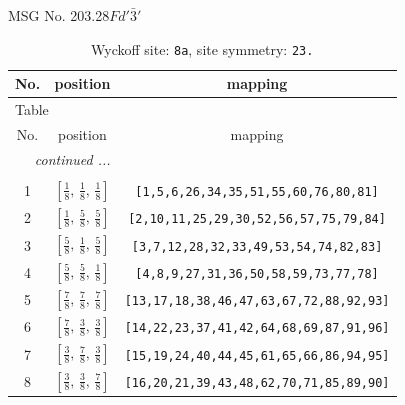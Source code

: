 \documentclass[fleqn,8pt]{jsarticle}
\begin{document}
\setcounter{MaxMatrixCols}{32}

\renewcommand{\tablename}{Table~}
\renewcommand{\figurename}{Figure~}
\begin{center}
\LARGE
MSG No. 203.28\quad$Fd'\bar{3}'$
\end{center}
\renewcommand{\arraystretch}{1.2}
\begin{longtable}{ccc}
\caption{Wyckoff site: {\tt 8a}, site symmetry: {\tt 23.}}
 \\
 \hline \hline
No. & position & mapping \\ \hline \endfirsthead

\multicolumn{2}{l}{\tablename\ \thetable{}} \\
 \hline \hline
No. & position & mapping \\ \hline \endhead

 \hline \hline
\multicolumn{2}{r}{\footnotesize\it continued ...} \\ \endfoot

 \hline \hline
\multicolumn{2}{r}{} \\ \endlastfoot

1 & $\left[ \frac{1}{8},\, \frac{1}{8},\, \frac{1}{8} \right]$ & {\tt [1,5,6,26,34,35,51,55,60,76,80,81]} \\ \hline
2 & $\left[ \frac{1}{8},\, \frac{5}{8},\, \frac{5}{8} \right]$ & {\tt [2,10,11,25,29,30,52,56,57,75,79,84]} \\ \hline
3 & $\left[ \frac{5}{8},\, \frac{1}{8},\, \frac{5}{8} \right]$ & {\tt [3,7,12,28,32,33,49,53,54,74,82,83]} \\ \hline
4 & $\left[ \frac{5}{8},\, \frac{5}{8},\, \frac{1}{8} \right]$ & {\tt [4,8,9,27,31,36,50,58,59,73,77,78]} \\ \hline
5 & $\left[ \frac{7}{8},\, \frac{7}{8},\, \frac{7}{8} \right]$ & {\tt [13,17,18,38,46,47,63,67,72,88,92,93]} \\ \hline
6 & $\left[ \frac{7}{8},\, \frac{3}{8},\, \frac{3}{8} \right]$ & {\tt [14,22,23,37,41,42,64,68,69,87,91,96]} \\ \hline
7 & $\left[ \frac{3}{8},\, \frac{7}{8},\, \frac{3}{8} \right]$ & {\tt [15,19,24,40,44,45,61,65,66,86,94,95]} \\ \hline
8 & $\left[ \frac{3}{8},\, \frac{3}{8},\, \frac{7}{8} \right]$ & {\tt [16,20,21,39,43,48,62,70,71,85,89,90]} \\
\end{longtable}
\renewcommand{\arraystretch}{1.2}
\end{document}

